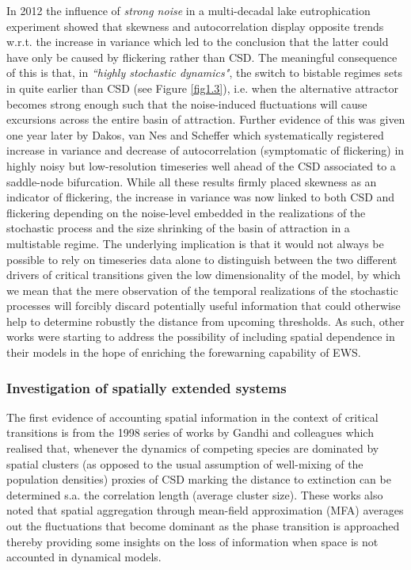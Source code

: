 \documentclass[../main.tex]{subfiles}
\begin{document}
In 2012 the influence of \textit{strong noise} in a multi-decadal lake eutrophication experiment showed that skewness and autocorrelation display opposite trends w.r.t. the increase in variance \cite{Wang12} which led to the conclusion that the latter could have only be caused by flickering rather than CSD.
The meaningful consequence of this is that, in \textit{``highly stochastic dynamics"}, the switch to bistable regimes sets in quite earlier than CSD (see Figure \ref{fig1.3}), i.e. when the alternative attractor becomes strong enough such that the noise-induced fluctuations will cause excursions across the entire basin of attraction.
Further evidence of this was given one year later by Dakos, van Nes and Scheffer \cite{Dakos13} which systematically registered increase in variance and decrease of autocorrelation (symptomatic of flickering) in highly noisy but low-resolution timeseries well ahead of the CSD associated to a saddle-node bifurcation.
While all these results firmly placed skewness as an indicator of flickering, the increase in variance was now linked to both CSD and flickering depending on the noise-level embedded in the realizations of the stochastic process and the size shrinking of the basin of attraction in a multistable regime.
The underlying implication is that it would not always be possible to rely on timeseries data alone to distinguish between the two different drivers of critical transitions given the low dimensionality of the model, by which we mean that the mere observation of the temporal realizations of the stochastic processes will forcibly discard potentially useful information that could otherwise help to determine robustly the distance from upcoming thresholds.
As such, other works were starting to address the possibility of including spatial dependence in their models in the hope of enriching the forewarning capability of EWS.
\subsubsection{Investigation of spatially extended systems}\label{subsubsec1.2.4}
The first evidence of accounting spatial information in the context of critical transitions is from the 1998 series of works by Gandhi and colleagues \cite{Gandhi98} which realised that, whenever the dynamics of competing species are dominated by spatial clusters (as opposed to the usual assumption of well-mixing of the population densities) proxies of CSD marking the distance to extinction can be determined s.a. the correlation length (average cluster size). 
These works also noted that spatial aggregation through mean-field approximation (MFA) averages out the fluctuations that become dominant as the phase transition is approached thereby providing some insights on the loss of information when space is not accounted in dynamical models.
\end{document}
